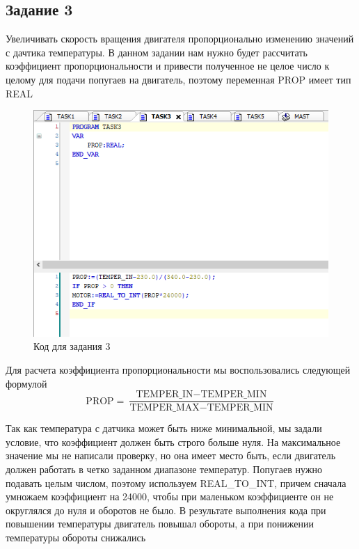 \documentclass[a4paper, 16pt]{article}
\begin{document}
    \subsection{Задание 3}
    \noindent Увеличивать скорость вращения двигателя пропорционально изменению значений с дачтика температуры.
    В данном задании нам нужно будет рассчитать коэффициент пропорциональности и привести полученное не целое число
    к целому для подачи попугаев на двигатель, поэтому переменная PROP имеет тип REAL
    \begin{figure}[h!]
        \centering
        \includegraphics[scale=0.8]{t3.png}
        \captionsetup{skip=0pt}
        \caption{Код для задания 3}
        \label{Рис:6}
    \end{figure}


    \noindent Для расчета коэффициента пропорциональности мы воспользовались следующей формулой
    $$
    \text{PROP} = \frac{\text{TEMPER\_IN} - \text{TEMPER\_MIN}}{\text{TEMPER\_MAX} - \text{TEMPER\_MIN}}
    $$


    \noindent Так как температура с датчика может быть ниже минимальной, мы задали условие, что коэффициент
    должен быть строго больше нуля. На максимальное значение мы не написали проверку, но она имеет место быть, если
    двигатель должен работать в четко заданном диапазоне температур. Попугаев нужно подавать целым числом, поэтому используем
    REAL\_{TO}\_{INT}, причем сначала умножаем коэффициент на 24000, чтобы при маленьком коэффициенте он не округлялся до нуля и оборотов
    не было. В результате выполнения кода при повышении температуры
    двигатель повышал обороты, а при понижении температуры обороты снижались
\end{document}
